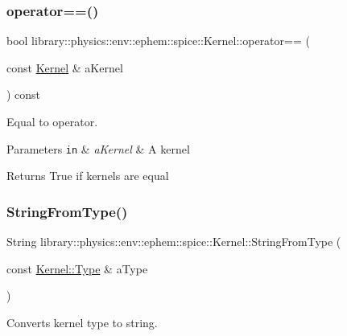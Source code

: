 \subsubsection{\texorpdfstring{operator==()}{operator==()}}
{\footnotesize\ttfamily bool library\+::physics\+::env\+::ephem\+::spice\+::\+Kernel\+::operator== (\begin{DoxyParamCaption}\item[{const \hyperlink{classlibrary_1_1physics_1_1env_1_1ephem_1_1spice_1_1_kernel}{Kernel} \&}]{a\+Kernel }\end{DoxyParamCaption}) const}



Equal to operator. 


\begin{DoxyParams}[1]{Parameters}
\mbox{\tt in}  & {\em a\+Kernel} & A kernel \\
\hline
\end{DoxyParams}
\begin{DoxyReturn}{Returns}
True if kernels are equal 
\end{DoxyReturn}
\mbox{\label{classlibrary_1_1physics_1_1env_1_1ephem_1_1spice_1_1_kernel_aa39fc387e6e3024749029545d74650c9}} 
\subsubsection{\texorpdfstring{String\+From\+Type()}{StringFromType()}}
{\footnotesize\ttfamily String library\+::physics\+::env\+::ephem\+::spice\+::\+Kernel\+::\+String\+From\+Type (\begin{DoxyParamCaption}\item[{const \hyperlink{classlibrary_1_1physics_1_1env_1_1ephem_1_1spice_1_1_kernel_ab28fd08b98057f635ee6a0e75b59fae6}{Kernel\+::\+Type} \&}]{a\+Type }\end{DoxyParamCaption})\hspace{0.3cm}{\ttfamily [static]}}



Converts kernel type to string. 


